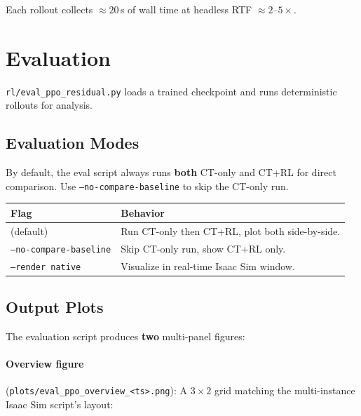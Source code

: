 \documentclass[11pt, a4paper]{article}
\begin{document}
Each rollout collects $\approx 20$\,s of wall time at headless RTF $\approx 2$--$5\times$.


\section{Evaluation}
\label{sec:eval}

\texttt{rl/eval\_ppo\_residual.py} loads a trained checkpoint and runs
deterministic rollouts for analysis.

\subsection{Evaluation Modes}

By default, the eval script always runs \textbf{both} CT-only and CT+RL
for direct comparison.  Use \texttt{--no-compare-baseline} to skip the
CT-only run.

\begin{center}
\begin{tabular}{lp{8cm}}
\toprule
\textbf{Flag} & \textbf{Behavior} \\
\midrule
(default)                       & Run CT-only then CT+RL, plot both side-by-side. \\
\texttt{--no-compare-baseline}  & Skip CT-only run, show CT+RL only. \\
\texttt{--render native}        & Visualize in real-time Isaac Sim window. \\
\bottomrule
\end{tabular}
\end{center}

\subsection{Output Plots}

The evaluation script produces \textbf{two} multi-panel figures:

\paragraph{Overview figure} (\texttt{plots/eval\_ppo\_overview\_<ts>.png}):
A $3 \times 2$ grid matching the multi-instance Isaac Sim script's layout:
\end{document}
